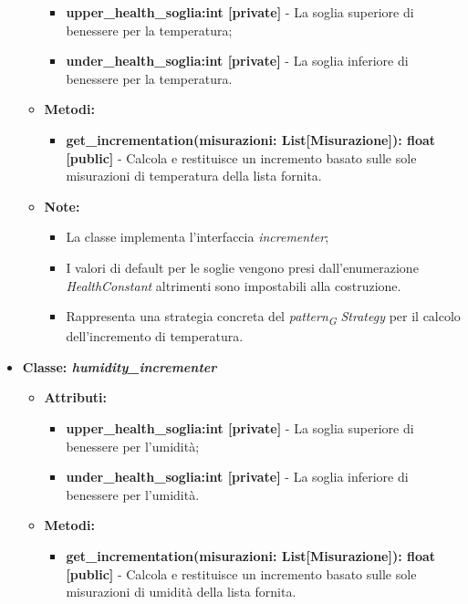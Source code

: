 \begin{itemize}
\begin{itemize}
        \begin{itemize}
        \item \textbf{upper\_health\_soglia:int [private]} - La soglia superiore di benessere per la temperatura;
        \item \textbf{under\_health\_soglia:int [private]} - La soglia inferiore di benessere per la temperatura.
    \end{itemize}
    \item \textbf{Metodi: }
    \begin{itemize}
        \item \textbf{get\_incrementation(misurazioni: List[Misurazione]): float [public]} - Calcola e restituisce un incremento basato sulle sole misurazioni di temperatura della lista fornita.
    \end{itemize}
    \item\textbf{Note:}
        \begin{itemize}
            \item La classe implementa l'interfaccia \textit{incrementer};
            \item I valori di default per le soglie vengono presi dall'enumerazione \textit{HealthConstant} altrimenti sono impostabili alla costruzione.
            \item Rappresenta una strategia concreta del \textit{pattern}\textsubscript{\textit{G}} \textit{Strategy} per il calcolo dell'incremento di temperatura.
        \end{itemize}
    \end{itemize}
    \item{\textbf{Classe: \textit{humidity\_incrementer}}}
    \begin{itemize}
    \item\textbf{Attributi:}
        \begin{itemize}
        \item \textbf{upper\_health\_soglia:int [private]} - La soglia superiore di benessere per l'umidità;
        \item \textbf{under\_health\_soglia:int [private]} - La soglia inferiore di benessere per l'umidità.
    \end{itemize}
    \item \textbf{Metodi: }
    \begin{itemize}
        \item \textbf{get\_incrementation(misurazioni: List[Misurazione]): float [public]} - Calcola e restituisce un incremento basato sulle sole misurazioni di umidità della lista fornita.

\end{itemize}
\end{itemize}
\end{itemize}
